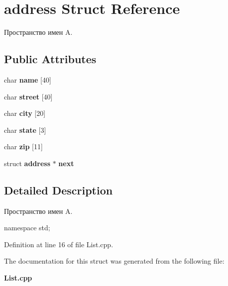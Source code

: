 \section{address Struct Reference}
\label{structaddress}


Пространство имен A.  


\subsection*{Public Attributes}
\begin{DoxyCompactItemize}
\item 
char {\bfseries name} [40]\label{structaddress_a2aaf4b88edfd2d1fc111fe66161a0c20}

\item 
char {\bfseries street} [40]\label{structaddress_a6637fb175db73273b18545c7e862d0e9}

\item 
char {\bfseries city} [20]\label{structaddress_a4852ddbf08c42594e621cd02e5896aa5}

\item 
char {\bfseries state} [3]\label{structaddress_ac8434820bdc27fbb4fc3ead62b1983ec}

\item 
char {\bfseries zip} [11]\label{structaddress_a4d23b9ff269dec0d61b9398e2a0eb3aa}

\item 
struct {\bf address} $\ast$ {\bfseries next}\label{structaddress_a7fc6469ede585dbf482921487f2e233c}

\end{DoxyCompactItemize}


\subsection{Detailed Description}
Пространство имен A. 

namespace std; 

Definition at line 16 of file List.\-cpp.



The documentation for this struct was generated from the following file\-:\begin{DoxyCompactItemize}
\item 
{\bf List.\-cpp}\end{DoxyCompactItemize}
